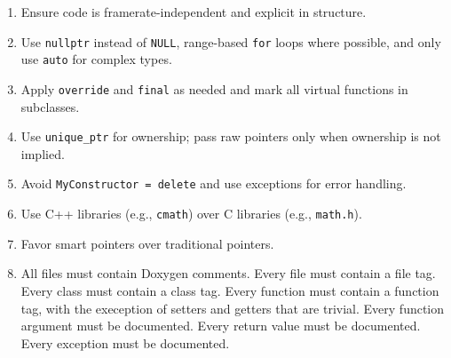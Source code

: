 \documentclass{article}
\begin{document}
\begin{enumerate}[left=0pt, align=left]
    \item Ensure code is framerate-independent and explicit in structure.

    \item Use \texttt{nullptr} instead of \texttt{NULL}, range-based \texttt{for} loops where possible, and only use \texttt{auto} for complex types.

    \item Apply \texttt{override} and \texttt{final} as needed and mark all virtual functions in subclasses.

    \item Use \texttt{unique\_ptr} for ownership; pass raw pointers only when ownership is not implied.

    \item Avoid \texttt{MyConstructor = delete} and use exceptions for error handling.

    \item Use C++ libraries (e.g., \texttt{cmath}) over C libraries (e.g., \texttt{math.h}).

    \item Favor smart pointers over traditional pointers.
    
    \item All files must contain Doxygen comments.
        \subitem Every file must contain a file tag.
        \subitem Every class must contain a class tag.
        \subitem Every function must contain a function tag, with the exeception of setters and getters that are trivial. 
        \subitem Every function argument must be documented. 
        \subitem Every return value must be documented.
        \subitem Every exception must be documented.
 
\end{enumerate}
\end{document}
